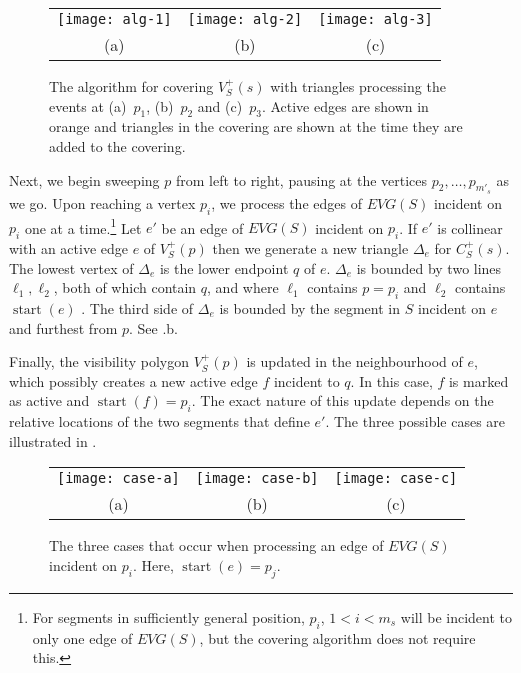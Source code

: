 \documentclass{patmorin}
\newcommand{\EVG}{\mathit{EVG}}
\DeclareMathOperator{\start}{start}
\begin{document}
\begin{figure}
  \begin{center}
    \begin{tabular}{ccc}
      \texttt{[image: alg-1]} &
      \texttt{[image: alg-2]} &
      \texttt{[image: alg-3]} \\
      (a) & (b) & (c)
    \end{tabular}
  \end{center}
  \caption{The algorithm for covering $V^+_S(s)$ with triangles processing
           the events at (a)~$p_1$, (b)~$p_2$ and (c)~$p_3$.  
           Active edges are shown in orange and triangles in the covering
are shown at the time they are added to the covering.}
\end{figure}

Next, we begin sweeping $p$ from left to right, pausing at the vertices
$p_2,\ldots,p_{m'_s}$ as we go.  Upon reaching a vertex $p_i$, we process
the edges of $\EVG(S)$ incident on $p_i$ one at a time.\footnote{For
segments in sufficiently general position, $p_i$, $1<i<m_s$ will be
incident to only one edge of $\EVG(S)$, but the covering algorithm does not
require this.}  Let $e'$ be an edge of $\EVG(S)$ incident on $p_i$. If $e'$
is collinear with an active edge $e$ of $V^+_S(p)$ then we generate a new
triangle $\Delta_e$ for $C^+_S(s)$.  The lowest vertex of $\Delta_e$ is the
lower endpoint $q$ of $e$. $\Delta_e$ is bounded by two lines
$\ell_1,\ell_2$, both of which contain $q$, and where $\ell_1$ contains
$p=p_i$ and $\ell_2$ contains $\start(e)$ .  The third side of $\Delta_e$
is bounded by the segment in $S$ incident on $e$ and furthest from $p$. See
.b.

Finally, the visibility polygon $V^+_S(p)$ is updated in the neighbourhood of
$e$, which possibly creates a new active edge $f$ incident to $q$.  In this
case, $f$ is marked as active and $\start(f)=p_i$.  The exact nature of
this update depends on the relative locations of the two segments that
define $e'$.  The three possible cases are illustrated in .

\begin{figure}
  \begin{center}
    \begin{tabular}{|c|c|c|}
      \texttt{[image: case-a]} &
      \texttt{[image: case-b]} &
      \texttt{[image: case-c]} \\
      (a) & (b) & (c)
    \end{tabular}
  \end{center}
  \caption{The three cases that occur when processing an edge of $\EVG(S)$
incident on $p_i$.  Here, $\start(e)=p_j$.}
\end{figure}
\end{document}
